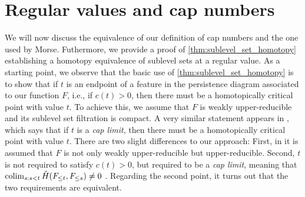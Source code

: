 
\section{Regular values and cap numbers} \label{s:caps}
We will now discuss the equivalence of our definition of cap numbers and the one used by Morse.
Futhermore, we provide a proof of \cref{thm:sublevel_set_homotopy} establishing a homotopy equivalence of sublevel sets at a regular value.
As a starting point, we observe that the basic use of \cref{thm:sublevel_set_homotopy} is to show that if $t$ is an endpoint of a feature in the persistence diagram associated to our function $F$, i.e., if $c(t) > 0$, then there must be a homotopically critical point with value $t$.
To achieve this, we assume that $F$ is weakly upper-reducible and its sublevel set filtration is compact.
A very similar statement appears in \cite[Theorem 8.1]{Morse.1938}, which says that if $t$ is a \emph{cap limit}, then there must be a homotopically critical point with value $t$.
There are two slight differences to our approach:
First, in \cite[Theorem 8.1]{Morse.1938} it is assumed that $F$ is not only weakly upper-reducible but upper-reducible.
Second, $t$ is not required to satisfy $c(t) > 0$, but required to be a \emph{cap limit}, meaning that $\operatorname*{colim}_{s: s < t} \check{H}(F_{\leq t}, F_{\leq s}) \neq 0$ \cite[p.~12]{Morse.1938}.
Regarding the second point, it turns out that the two requirements are equivalent.

